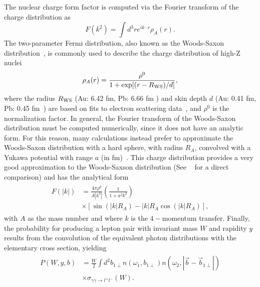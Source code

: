 \documentclass[12pt,epjc3]{svjour3}\sloppy
\begin{document}
The nuclear charge form factor is computed via the Fourier transform of the charge distribution as
\begin{equation}
    F(k^2) = \int d^3r e^{ ik \cdot r } \rho_{A}( r ).
\end{equation}
The two-parameter Fermi distribution, also known as the Woods-Saxon distribution~\cite{woodsDiffuseSurfaceOptical1954}, is commonly used to describe the charge distribution of high-Z nuclei
\begin{equation}
    \label{eq:woods-saxon}
            \rho_{A}(r)=\frac{\rho^{0}}{1+\exp[(r-R_{\rm{WS}})/d]},
 \end{equation}
where the radius $R_{\rm{WS}}$ (Au: 6.42 fm, Pb: 6.66 fm ) and skin depth $d$ (Au: 0.41 fm, Pb: 0.45 fm~\cite{shouParameterizationDeformedNuclei2015}) are based on fits to electron scattering data~\cite{barrettNuclearSizesStructure1977,devriesNuclearChargedensitydistributionParameters1987a}, and $\rho^{0}$ is the normalization factor. In general, the Fourier transform of the Woods-Saxon distribution must be computed numerically, since it does not have an analytic form. For this reason, many calculations instead prefer to approximate the Woods-Saxon distribution with a hard sphere, with radius $R_A$, convolved with a Yukawa potential with range $a$ (in fm)~\cite{daviesCalculationMomentsPotentials1976}. This charge distribution provides a very good approximation to the Woods-Saxson distribution (See ~\cite{kleinExclusiveVectorMeson1999a} for a direct comparison) and has the analytical form 
\begin{align}
    \begin{split}
    F(|k|) & =  \frac{4\pi\rho^0}{A |k^3|} \left( \frac{1}{1+a^2k^2} \right) \\
    & \times \left[ \sin{(|k| R_A)} - |k| R_A\cos{(|k| R_A)}  \right] , 
    \end{split}
\end{align}
with $A$ as the mass number and where $k$ is the $4-$momentum transfer. Finally, the probability for producing a lepton pair with invariant mass $W$ and rapidity $y$ results from the convolution of the equivalent photon distributions with the elementary cross section, yielding
\begin{align}
    \begin{split}
    P(W,y,b) & = \frac{W}{2}\int d^{2}b_{1\perp}  n(\omega_{1},b_{1\perp}) n(\omega_{2},|\vec{b} - \vec{b}_{1\perp}|) \\ 
    & \times \sigma_{\gamma \gamma \rightarrow l^{+}l^{-}}(W).
    \label{eq:epa_xs}
  \end{split}
\end{align}
\end{document}
